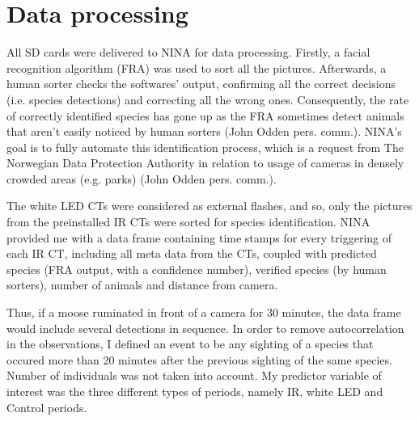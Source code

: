 






\section{Data processing} %
All SD cards were delivered to NINA for data processing.
Firstly, a facial recognition algorithm (FRA) was used to sort all the pictures. %
Afterwards, a human sorter checks the softwares' output, confirming all the correct decisions (i.e. species detections) and correcting all the wrong ones. 
Consequently, the rate of correctly identified species has gone up as the FRA sometimes detect animals that aren't easily noticed by human sorters (John Odden pers. comm.). 
NINA's goal is to fully automate this identification process, which is a request from The Norwegian Data Protection Authority in relation to usage of cameras in densely crowded areas (e.g. parks) (John Odden pers. comm.).

The white LED CTs were considered as external flashes, and so, only the pictures from the preinstalled IR CTs were sorted for species identification.
NINA provided me with a data frame containing time stamps for every triggering of each IR CT, including all meta data from the CTs, coupled with predicted species (FRA output, with a confidence number), verified species (by human sorters), number of animals and distance from camera.

Thus, if a moose ruminated in front of a camera for 30 minutes, the data frame would include several detections in sequence.
In order to remove autocorrelation in the observations, I defined an event to be any sighting of a species that occured more than 20 minutes after the previous sighting of the same species.
Number of individuals was not taken into account.
My predictor variable of interest was the three different types of periods, namely IR, white LED and Control periods.

